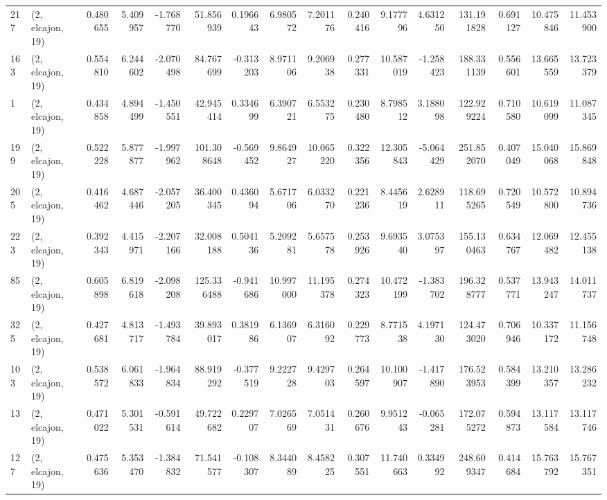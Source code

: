\begin{tabular}{llrrrrrrrrrrrrrr}
217 &  (2, elcajon, 19) &   0.480655 &   5.409957 &  -1.768770 &    51.856939 &   0.196643 &   6.980572 &   7.201176 &  0.240416 &   9.177796 &   4.631250 &   131.191828 &  0.691127 &  10.475846 &  11.453900 \\
163 &  (2, elcajon, 19) &   0.554810 &   6.244602 &  -2.070498 &    84.767699 &  -0.313203 &   8.971106 &   9.206938 &  0.277331 &  10.587019 &  -1.258423 &   188.331139 &  0.556601 &  13.665559 &  13.723379 \\
1   &  (2, elcajon, 19) &   0.434858 &   4.894499 &  -1.450551 &    42.945414 &   0.334699 &   6.390721 &   6.553275 &  0.230480 &   8.798512 &   3.188098 &   122.929224 &  0.710580 &  10.619099 &  11.087345 \\
199 &  (2, elcajon, 19) &   0.522228 &   5.877877 &  -1.997962 &   101.308648 &  -0.569452 &   9.864927 &  10.065220 &  0.322356 &  12.305843 &  -5.064429 &   251.852070 &  0.407049 &  15.040068 &  15.869848 \\
205 &  (2, elcajon, 19) &   0.416462 &   4.687446 &  -2.057205 &    36.400345 &   0.436094 &   5.671706 &   6.033270 &  0.221236 &   8.445619 &   2.628911 &   118.695265 &  0.720549 &  10.572800 &  10.894736 \\
223 &  (2, elcajon, 19) &   0.392343 &   4.415971 &  -2.207166 &    32.008188 &   0.504136 &   5.209281 &   5.657578 &  0.253926 &   9.693540 &   3.075397 &   155.130463 &  0.634767 &  12.069482 &  12.455138 \\
85  &  (2, elcajon, 19) &   0.605898 &   6.819618 &  -2.098208 &   125.336488 &  -0.941686 &  10.997000 &  11.195378 &  0.274323 &  10.472199 &  -1.383702 &   196.328777 &  0.537771 &  13.943247 &  14.011737 \\
325 &  (2, elcajon, 19) &   0.427681 &   4.813717 &  -1.493784 &    39.893017 &   0.381986 &   6.136907 &   6.316092 &  0.229773 &   8.771538 &   4.197130 &   124.473020 &  0.706946 &  10.337172 &  11.156748 \\
103 &  (2, elcajon, 19) &   0.538572 &   6.061833 &  -1.964834 &    88.919292 &  -0.377519 &   9.222728 &   9.429703 &  0.264597 &  10.100907 &  -1.417890 &   176.523953 &  0.584399 &  13.210357 &  13.286232 \\
13  &  (2, elcajon, 19) &   0.471022 &   5.301531 &  -0.591614 &    49.722682 &   0.229707 &   7.026569 &   7.051431 &  0.260676 &   9.951243 &  -0.065281 &   172.075272 &  0.594873 &  13.117584 &  13.117746 \\
127 &  (2, elcajon, 19) &   0.475636 &   5.353470 &  -1.384832 &    71.541577 &  -0.108307 &   8.344089 &   8.458225 &  0.307551 &  11.740663 &   0.334992 &   248.609347 &  0.414684 &  15.763792 &  15.767351 \\

\end{tabular}
